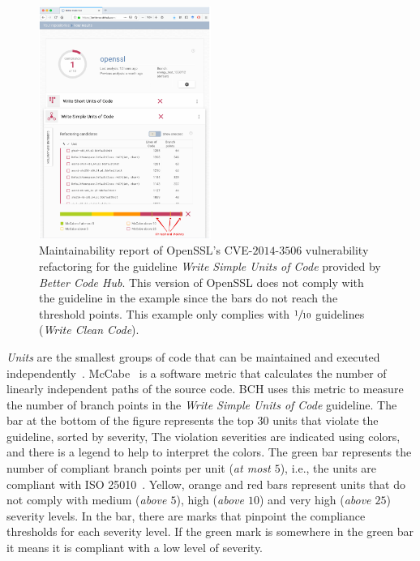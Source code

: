 \documentclass[10pt,conference]{IEEEtran}
\begin{document}
\begin{figure}[h]
 	\centering 	\includegraphics[width=0.5\textwidth]{figures/bch_report.png}
 	\caption{Maintainability report of OpenSSL's CVE-$2014$-$3506$ vulnerability
refactoring for the guideline \emph{Write Simple Units of Code} provided by
\emph{Better Code Hub}. This version of OpenSSL does not comply with the
guideline in the example since the bars do not reach the threshold points. This
example only complies with $\sfrac{1}{10}$ guidelines (\emph{Write Clean Code}).}
	\label{fig:bchrep}
\end{figure}

\emph{Units} are the smallest groups of code that can be maintained and executed
independently~\cite{Visser:2016:OREILLY}. McCabe~\cite{1702388} is a software
metric that calculates the number of linearly independent paths of the source
code. BCH uses this metric to measure the number of branch points in the
\emph{Write Simple Units of Code} guideline. The bar at the bottom of the figure
represents the top $30$ units that violate the guideline, sorted by severity,
The violation severities are indicated using colors, and there is a legend to
help to interpret the colors. The green bar represents the number of compliant
branch points per unit (\emph{at most $5$}), i.e., the units are compliant with
ISO 25010~\cite{iso:2011}. Yellow, orange and red bars represent units that do
not comply with medium (\emph{above $5$}), high (\emph{above $10$}) and very high
(\emph{above $25$}) severity levels. In the bar, there are marks that pinpoint the
compliance thresholds for each severity level. If the green mark is somewhere
in the green bar it means it is compliant with a low level of severity.
\end{document}
